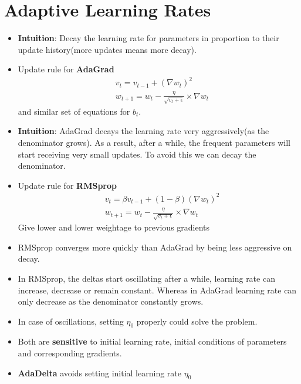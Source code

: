 \documentclass[a4paper]{article}
\begin{document}
\section{Adaptive Learning Rates}
\begin{itemize}
    \item \textbf{Intuition}: Decay the learning rate for parameters in proportion to their update history(more updates means more decay).
    \item Update rule for \textbf{AdaGrad}
    \begin{equation*}
        \begin{split}
            &v_t = v_{t-1} + (\nabla w_t)^2\\
            &w_{t+1} = w_t - \frac{\eta}{\sqrt{v_t+\epsilon}}\times \nabla w_t
        \end{split}
    \end{equation*}
    and similar set of equations for $b_t$.
    \item \textbf{Intuition}: AdaGrad decays the learning rate very aggressively(as the denominator grows). As a result, after a while, the frequent parameters will start receiving very small updates. To avoid this we can decay the denominator.
    \item Update rule for \textbf{RMSprop}
    \begin{equation*}
        \begin{split}
            &v_t = \beta v_{t-1} + (1-\beta)(\nabla w_t)^2\\
            &w_{t+1}=w_t-\frac{\eta}{\sqrt{v_t+\epsilon}}\times \nabla w_t
        \end{split}
    \end{equation*}
    Give lower and lower weightage to previous gradients
    \item RMSprop converges more quickly than AdaGrad by being less aggressive on decay.
    \item In RMSprop, the deltas start oscillating after a while, learning rate can increase, decrease or remain constant. Whereas in AdaGrad learning rate can only decrease as the denominator constantly grows.
    \item In case of oscillations, setting $\eta_0$ properly could solve the problem.
    \item Both are \textbf{sensitive} to initial learning rate, initial conditions of parameters and corresponding gradients.
    \item \textbf{AdaDelta} avoids setting initial learning rate $\eta_0$
    \begin{equation*}

\end{equation*}
\end{itemize}
\end{document}
